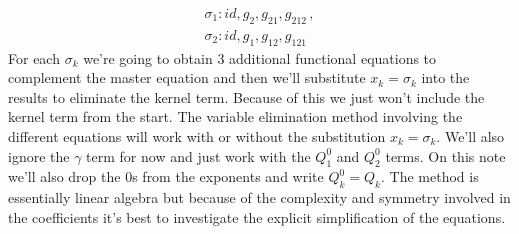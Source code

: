 \begin{align}
	\sigma_1: id, g_2, g_{21}, g_{212}\,,\\
	\sigma_2: id, g_1, g_{12}, g_{121}
\end{align}
For each $\sigma_k$ we're going to obtain 3 additional functional equations to complement the master equation and then we'll substitute $x_k = \sigma_k$ into the results to eliminate the kernel term. Because of this we just won't include the kernel term from the start. The variable elimination method involving the different equations will work with or without the substitution $x_k = \sigma_k$. We'll also ignore the $\gamma$ term for now and just work with the $Q_1^0$ and $Q_2^0$ terms. On this note we'll also drop the 0s from the exponents and write $Q_k^0 = Q_k$. The method is essentially linear algebra but because of the complexity and symmetry involved in the coefficients it's best to investigate the explicit simplification of the equations.
